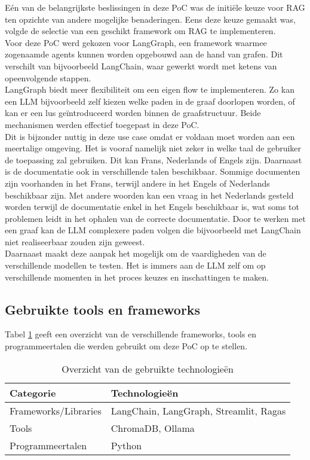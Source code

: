 Eén van de belangrijkste beslissingen in deze PoC was de initiële keuze voor RAG ten opzichte van andere mogelijke benaderingen. Eens deze keuze gemaakt was, volgde de selectie van een geschikt framework om RAG te implementeren.
\\[1em]
Voor deze PoC werd gekozen voor LangGraph, een framework waarmee zogenaamde agents kunnen worden opgebouwd aan de hand van grafen. Dit verschilt van bijvoorbeeld LangChain, waar gewerkt wordt met ketens van opeenvolgende stappen.
\\[1em]
LangGraph biedt meer flexibiliteit om een eigen flow te implementeren. Zo kan een LLM bijvoorbeeld zelf kiezen welke paden in de graaf doorlopen worden, of kan er een lus geïntroduceerd worden binnen de graafstructuur. Beide mechanismen werden effectief toegepast in deze PoC.
\\[1em]
Dit is bijzonder nuttig in deze use case omdat er voldaan moet worden aan een meertalige omgeving. Het is vooraf namelijk niet zeker in welke taal de gebruiker de toepassing zal gebruiken. Dit kan Frans, Nederlands of Engels zijn. Daarnaast is de documentatie ook in verschillende talen beschikbaar. Sommige documenten zijn voorhanden in het Frans, terwijl andere in het Engels of Nederlands beschikbaar zijn. Met andere woorden kan een vraag in het Nederlands gesteld worden terwijl de documentatie enkel in het Engels beschikbaar is, wat soms tot problemen leidt in het ophalen van de correcte documentatie. Door te werken met een graaf kan de LLM complexere paden volgen die bijvoorbeeld met LangChain niet realiseerbaar zouden zijn geweest.
\\[1em]
Daarnaast maakt deze aanpak het mogelijk om de vaardigheden van de verschillende modellen te testen. Het is immers aan de LLM zelf om op verschillende momenten in het proces keuzes en inschattingen te maken.

\subsection{Gebruikte tools en frameworks}
Tabel \ref{tab:gebruikte_technologieen} geeft een overzicht van de verschillende frameworks, tools en programmeertalen die werden gebruikt om deze PoC op te stellen.

\begin{table}[H]
    \begin{tabular}{|l|l|}
        \hline
        \textbf{Categorie}       & \textbf{Technologieën}               \\ \hline
        Frameworks/Libraries     & LangChain, LangGraph, Streamlit, Ragas \\ \hline
        Tools                   & ChromaDB, Ollama                    \\ \hline
        Programmeertalen        & Python                             \\ \hline
    \end{tabular}
    \caption{Overzicht van de gebruikte technologieën}
    \label{tab:gebruikte_technologieen}
\end{table}

